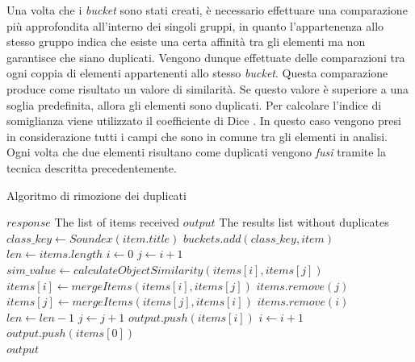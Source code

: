 Una volta che i \emph{bucket} sono stati creati, è necessario effettuare una comparazione più approfondita all'interno dei singoli gruppi, in quanto l'appartenenza allo stesso gruppo indica che esiste una certa affinità tra gli elementi ma non garantisce che siano duplicati. Vengono dunque effettuate delle comparazioni tra ogni coppia di elementi appartenenti allo stesso \emph{bucket}. Questa comparazione produce come risultato un valore di similarità. Se questo valore è superiore a una soglia predefinita, allora gli elementi sono duplicati. Per calcolare l'indice di somiglianza viene utilizzato il coefficiente di Dice \cite{dice1945measures}. In questo caso vengono presi in considerazione tutti i campi che sono in comune tra gli elementi in analisi. Ogni volta che due elementi risultano come duplicati vengono \emph{fusi} tramite la tecnica descritta precedentemente.

\begin{algorithm}
	\caption{Algoritmo di rimozione dei duplicati}
	\label{alg:algoritmo-rimozione-duplicati}
	\begin{algorithmic}
		\Require
		\Statex $ response $ \Comment The list of items received
		\Ensure
		\Statex $ output $ \Comment The results list without duplicates
		\Statex
		\State $ class\_key \gets Soundex(item.title) $
		\State $ buckets.add(class\_key, item) $
		\EndFor
		\State $ len \gets items.length $
		\State $ i \gets 0 $
		\State $ j \gets i + 1 $
		\State $ sim\_value \gets calculateObjectSimilarity(items[i], items[j])$
		\State $ items[i] \gets mergeItems(items[i], items[j]) $
		\State $ items.remove(j) $
		\Else
		\State $ items[j] \gets mergeItems(items[j], items[i]) $
		\State $ items.remove(i) $
		\EndIf
		\State $ len \gets len - 1 $
		\Else
		\State $ j \gets j + 1 $
		\EndIf
		\EndWhile
		\State $ output.push(items[i]) $
		\State $ i \gets i + 1 $
		\EndWhile
		\Else
		\State $ output.push(items[0]) $
		\EndIf
		\EndFor\\
		\Return $ output $
	\end{algorithmic}
\end{algorithm}

